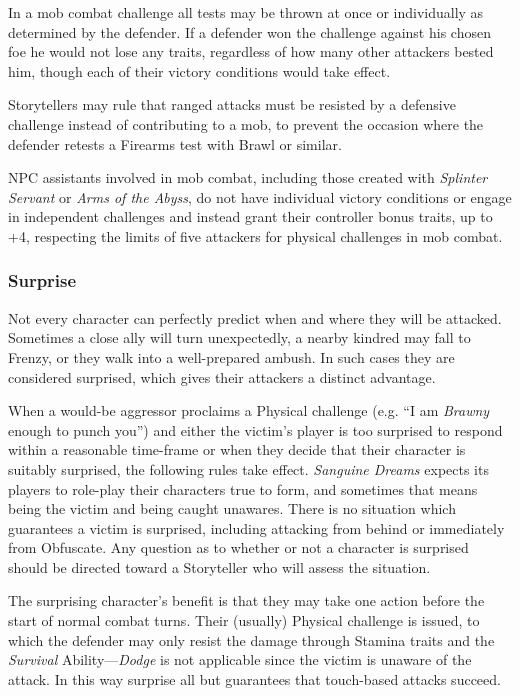 In a mob combat challenge all tests may be thrown at once or individually as determined by the 
defender.  If a defender won the challenge against his chosen foe he would not lose any traits, 
regardless of how many other attackers bested him, though each of their victory conditions would 
take effect.

Storytellers may rule that ranged attacks must be resisted by a defensive challenge instead of 
contributing to a mob, to prevent the occasion where the defender retests a Firearms test with 
Brawl or similar.

NPC assistants involved in mob combat, including those created with \emph{Splinter Servant} or 
\emph{Arms of the Abyss}, do not have individual victory conditions or engage in independent 
challenges and instead grant their controller bonus traits, up to +4, respecting the limits of 
five attackers for physical challenges in mob combat.

\subsubsection{Surprise}
Not every character can perfectly predict when and where they will be attacked.  Sometimes a 
close ally will turn unexpectedly, a nearby kindred may fall to Frenzy, or they walk into a 
well-prepared ambush.  In such cases they are considered surprised, which gives their attackers 
a distinct advantage.

When a would-be aggressor proclaims a Physical challenge (e.g. ``I am \emph{Brawny} enough to 
punch you'') and either the victim's player is too surprised to respond within a reasonable time-frame 
or when they decide that their character is suitably surprised, the following rules take effect.  
\emph{Sanguine Dreams} expects its players to role-play their characters true to form, and sometimes 
that means being the victim and being caught unawares.  There is no situation which guarantees a 
victim is surprised, including attacking from behind or immediately from Obfuscate.  Any question as 
to whether or not a character is surprised should be directed toward a Storyteller who will assess the 
situation.  

The surprising character's benefit is that they may take one action before the start of normal 
combat turns.  Their (usually) Physical challenge is issued, to which the defender may only resist 
the damage through Stamina traits and the \emph{Survival} Ability---\emph{Dodge} is not applicable 
since the victim is unaware of the attack.  In this way surprise all but guarantees that touch-based 
attacks succeed.

